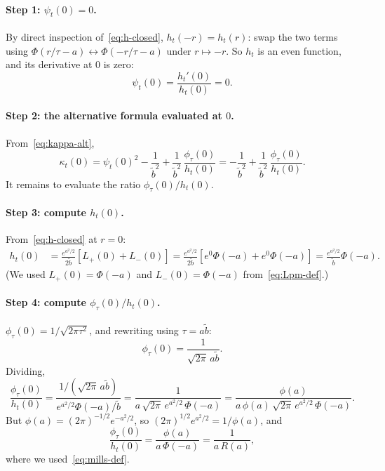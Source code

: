 \documentclass[11pt,a4paper,openany]{book}
\theoremstyle{plainserif}
\theoremstyle{definition}
\theoremstyle{remarkstyle}
\newcommand{\btilde}{\tilde{b}}
\newcommand{\mills}{R}
\begin{document}
\paragraph{Step 1: $\psi_t(0) = 0$.}
By direct inspection of~\eqref{eq:h-closed}, $h_t(-r) = h_t(r)$: swap the
two terms using $\Phi(r/\tau - a) \leftrightarrow \Phi(-r/\tau - a)$ under
$r\mapsto -r$. So $h_t$ is an even function, and its derivative at $0$ is
zero:
\begin{equation}
\psi_t(0) = \frac{h_t'(0)}{h_t(0)} = 0.
\end{equation}

\paragraph{Step 2: the alternative formula evaluated at $0$.}
From~\eqref{eq:kappa-alt},
\begin{equation}
\kappa_t(0) = \psi_t(0)^2 - \frac{1}{\btilde^2} + \frac{1}{\btilde^2}\,\frac{\phi_\tau(0)}{h_t(0)}
            = -\frac{1}{\btilde^2} + \frac{1}{\btilde^2}\,\frac{\phi_\tau(0)}{h_t(0)}.
\label{eq:mills-step2}
\end{equation}
It remains to evaluate the ratio $\phi_\tau(0)/h_t(0)$.

\paragraph{Step 3: compute $h_t(0)$.}
From~\eqref{eq:h-closed} at $r = 0$:
\begin{align}
h_t(0) &= \frac{e^{a^2/2}}{2\btilde}\left[L_+(0) + L_-(0)\right]
       = \frac{e^{a^2/2}}{2\btilde}\left[ e^0\Phi(-a) + e^0 \Phi(-a)\right]
       = \frac{e^{a^2/2}}{\btilde}\Phi(-a).
\label{eq:h0-value}
\end{align}
(We used $L_+(0) = \Phi(-a)$ and $L_-(0) = \Phi(-a)$ from~\eqref{eq:Lpm-def}.)

\paragraph{Step 4: compute $\phi_\tau(0)/h_t(0)$.}
$\phi_\tau(0) = 1/\sqrt{2\pi\tau^2}$, and rewriting using $\tau = a\btilde$:
\begin{equation}
\phi_\tau(0) = \frac{1}{\sqrt{2\pi}\, a\btilde}.
\end{equation}
Dividing,
\begin{equation}
\frac{\phi_\tau(0)}{h_t(0)}
 = \frac{1/(\sqrt{2\pi}\, a\btilde)}{e^{a^2/2}\Phi(-a)/\btilde}
 = \frac{1}{a\,\sqrt{2\pi}\,e^{a^2/2}\,\Phi(-a)}
 = \frac{\phi(a)}{a\,\phi(a)\,\sqrt{2\pi}\,e^{a^2/2}\,\Phi(-a)}.
\end{equation}
But $\phi(a) = (2\pi)^{-1/2} e^{-a^2/2}$, so
$(2\pi)^{1/2}e^{a^2/2} = 1/\phi(a)$, and
\begin{equation}
\frac{\phi_\tau(0)}{h_t(0)}
 = \frac{\phi(a)}{a\,\Phi(-a)}
 = \frac{1}{a\,\mills(a)},
\label{eq:ratio-is-mills}
\end{equation}
where we used~\eqref{eq:mills-def}.
\end{document}
